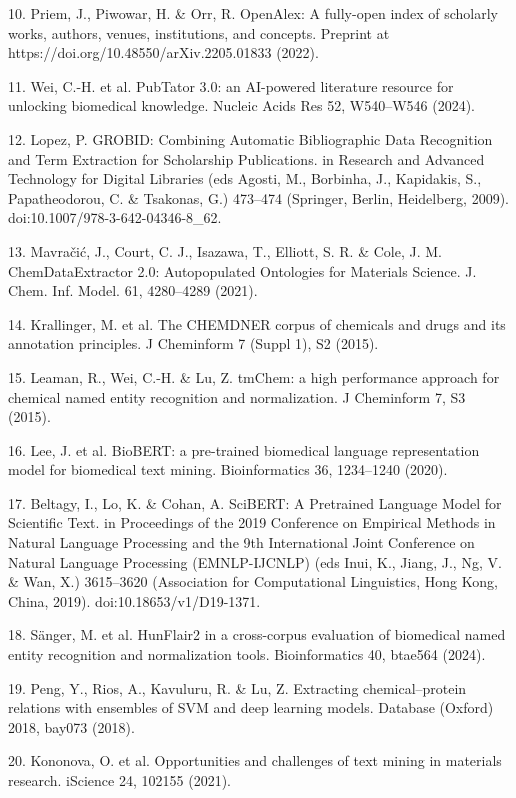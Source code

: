 \documentclass[
]{article}
\begin{document}
10. Priem, J., Piwowar, H. \& Orr, R. OpenAlex: A fully-open index of
scholarly works, authors, venues, institutions, and concepts. Preprint
at https://doi.org/10.48550/arXiv.2205.01833 (2022).

11. Wei, C.-H. et al. PubTator 3.0: an AI-powered literature resource
for unlocking biomedical knowledge. Nucleic Acids Res 52, W540--W546
(2024).

12. Lopez, P. GROBID: Combining Automatic Bibliographic Data Recognition
and Term Extraction for Scholarship Publications. in Research and
Advanced Technology for Digital Libraries (eds Agosti, M., Borbinha, J.,
Kapidakis, S., Papatheodorou, C. \& Tsakonas, G.) 473--474 (Springer,
Berlin, Heidelberg, 2009). doi:10.1007/978-3-642-04346-8\_62.

13. Mavračić, J., Court, C. J., Isazawa, T., Elliott, S. R. \& Cole, J.
M. ChemDataExtractor 2.0: Autopopulated Ontologies for Materials
Science. J. Chem. Inf. Model. 61, 4280--4289 (2021).

14. Krallinger, M. et al. The CHEMDNER corpus of chemicals and drugs and
its annotation principles. J Cheminform 7 (Suppl 1), S2 (2015).

15. Leaman, R., Wei, C.-H. \& Lu, Z. tmChem: a high performance approach
for chemical named entity recognition and normalization. J Cheminform 7,
S3 (2015).

16. Lee, J. et al. BioBERT: a pre-trained biomedical language
representation model for biomedical text mining. Bioinformatics 36,
1234--1240 (2020).

17. Beltagy, I., Lo, K. \& Cohan, A. SciBERT: A Pretrained Language
Model for Scientific Text. in Proceedings of the 2019 Conference on
Empirical Methods in Natural Language Processing and the 9th
International Joint Conference on Natural Language Processing
(EMNLP-IJCNLP) (eds Inui, K., Jiang, J., Ng, V. \& Wan, X.) 3615--3620
(Association for Computational Linguistics, Hong Kong, China, 2019).
doi:10.18653/v1/D19-1371.

18. Sänger, M. et al. HunFlair2 in a cross-corpus evaluation of
biomedical named entity recognition and normalization tools.
Bioinformatics 40, btae564 (2024).

19. Peng, Y., Rios, A., Kavuluru, R. \& Lu, Z. Extracting
chemical--protein relations with ensembles of SVM and deep learning
models. Database (Oxford) 2018, bay073 (2018).

20. Kononova, O. et al. Opportunities and challenges of text mining in
materials research. iScience 24, 102155 (2021).
\end{document}
